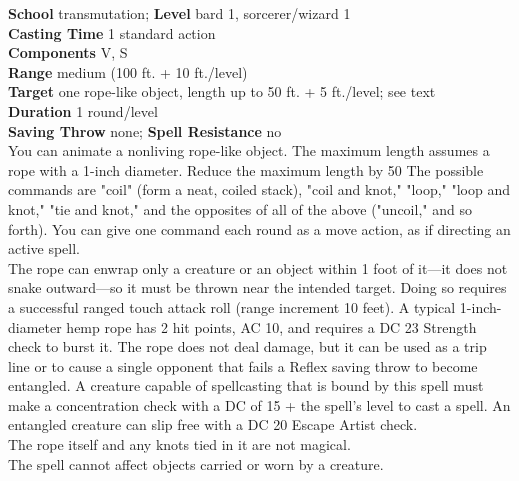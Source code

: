 \textbf{School} transmutation; \textbf{Level} bard 1, sorcerer/wizard 1\\
\textbf{Casting Time} 1 standard action\\
\textbf{Components} V, S\\
\textbf{Range }medium (100 ft. + 10 ft./level)\\
\textbf{Target} one rope-like object, length up to 50 ft. + 5 ft./level; see text\\
\textbf{Duration} 1 round/level\\
\textbf{Saving Throw} none;\textbf{ Spell Resistance} no\\
You can animate a nonliving rope-like object. The maximum length assumes a rope with a 1-inch diameter. Reduce the maximum length by 50%
The possible commands are "coil" (form a neat, coiled stack), "coil and knot," "loop," "loop and knot," "tie and knot," and the opposites of all of the above ("uncoil," and so forth). You can give one command each round as a move action, as if directing an active spell.\\
The rope can enwrap only a creature or an object within 1 foot of it—it does not snake outward—so it must be thrown near the intended target. Doing so requires a successful ranged touch attack roll (range increment 10 feet). A typical 1-inch-diameter hemp rope has 2 hit points, AC 10, and requires a DC 23 Strength check to burst it. The rope does not deal damage, but it can be used as a trip line or to cause a single opponent that fails a Reflex saving throw to become entangled. A creature capable of spellcasting that is bound by this spell must make a concentration check with a DC of 15 + the spell's level to cast a spell. An entangled creature can slip free with a DC 20 Escape Artist check.\\
The rope itself and any knots tied in it are not magical.\\
The spell cannot affect objects carried or worn by a creature.\\
